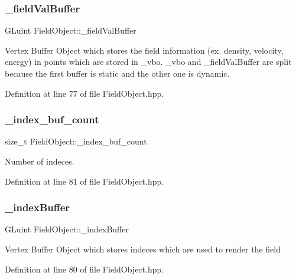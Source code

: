 \subsubsection{\texorpdfstring{\+\_\+field\+Val\+Buffer}{\_fieldValBuffer}}
{\footnotesize\ttfamily G\+Luint Field\+Object\+::\+\_\+field\+Val\+Buffer\hspace{0.3cm}{\ttfamily [protected]}}

Vertex Buffer Object which stores the field information (ex. density, velocity, energy) in points which are stored in \+\_\+vbo. \+\_\+vbo and \+\_\+field\+Val\+Buffer are split because the first buffer is static and the other one is dynamic. 

Definition at line 77 of file Field\+Object.\+hpp.

\mbox{\label{class_field_object_a737157aec4185354f55ccd36b8786461}} 
\subsubsection{\texorpdfstring{\+\_\+index\+\_\+buf\+\_\+count}{\_index\_buf\_count}}
{\footnotesize\ttfamily size\+\_\+t Field\+Object\+::\+\_\+index\+\_\+buf\+\_\+count\hspace{0.3cm}{\ttfamily [protected]}}

Number of indeces. 

Definition at line 81 of file Field\+Object.\+hpp.

\mbox{\label{class_field_object_a8bdf4e9d88a422e080ded80fe3c7ae08}} 
\subsubsection{\texorpdfstring{\+\_\+index\+Buffer}{\_indexBuffer}}
{\footnotesize\ttfamily G\+Luint Field\+Object\+::\+\_\+index\+Buffer\hspace{0.3cm}{\ttfamily [protected]}}

Vertex Buffer Object which stores indeces which are used to render the field 

Definition at line 80 of file Field\+Object.\+hpp.

